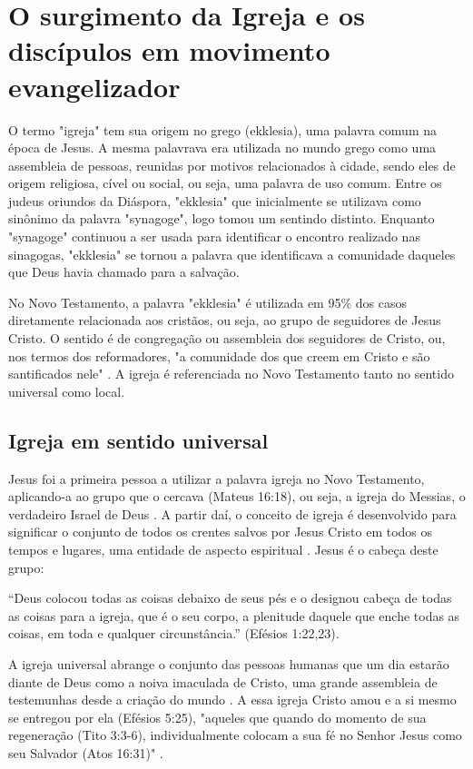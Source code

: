 \documentclass[12pt]{abntex2}
\begin{document}
\chapter{O surgimento da Igreja e os discípulos em movimento evangelizador}

O termo "igreja" tem sua origem no grego (ekklesia), uma palavra comum na época de Jesus. A mesma palavrava era utilizada no mundo grego como uma assembleia de pessoas, reunidas por motivos relacionados à cidade, sendo eles de origem religiosa, cível ou social, ou seja, uma palavra de uso comum\cite[p. 317]{zac}. Entre os judeus oriundos da Diáspora, "ekklesia" que inicialmente se utilizava como sinônimo da palavra "synagoge", logo tomou um sentindo distinto. Enquanto "synagoge" continuou a ser usada para identificar o encontro realizado nas sinagogas, "ekklesia" se tornou a palavra que identificava a comunidade daqueles que Deus havia chamado para a salvação\cite[p. 485]{bavinck}. 

No Novo Testamento, a palavra "ekklesia" é utilizada em 95\% dos casos diretamente relacionada aos cristãos, ou seja, ao grupo de seguidores de Jesus Cristo. O sentido é de congregação ou assembleia dos seguidores de Cristo, ou, nos termos dos reformadores, "a comunidade dos que creem em Cristo e são santificados nele" \cite[p. 318]{zac}. A igreja é referenciada no Novo Testamento tanto no sentido universal como local\cite[p. 318]{zac}.

\section{Igreja em sentido universal}

Jesus foi a primeira pessoa a utilizar a palavra igreja no Novo Testamento, aplicando-a ao grupo que o cercava (Mateus 16:18), ou seja, a igreja do Messias, o verdadeiro Israel de Deus \cite[p. 911]{berkhof}. A partir daí, o conceito de igreja é desenvolvido para significar o conjunto de todos os crentes salvos por Jesus Cristo em todos os tempos e lugares, uma entidade de aspecto espiritual \cite[p. 318]{zac}. Jesus é o cabeça deste grupo:

\begin{citacao}“Deus colocou todas as coisas debaixo de seus pés e o designou cabeça de todas as coisas para a igreja, que é o seu corpo, a plenitude daquele que enche todas as coisas, em toda e qualquer circunstância.” (Efésios 1:22,23).
\end{citacao}

A igreja universal abrange o conjunto das pessoas humanas que um dia estarão diante de Deus como a noiva imaculada de Cristo, uma grande assembleia de testemunhas desde a criação do mundo \cite[p. 607]{bavinck}. A essa igreja Cristo amou e a si mesmo se entregou por ela (Efésios 5:25), "aqueles que quando do momento de sua regeneração (Tito 3:3-6), individualmente colocam a sua fé no Senhor Jesus como seu Salvador (Atos 16:31)" \cite[p. 319]{zac}.
\end{document}
